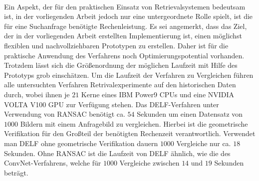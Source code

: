 \\
Ein Aspekt, der für den praktischen Einsatz von Retrievalsystemen bedeutsam ist, in der vorliegenden Arbeit jedoch nur eine untergeordnete Rolle spielt, ist die für eine Suchanfrage benötigte Rechenleistung. Es sei angemerkt, dass das Ziel, der in der vorliegenden Arbeit erstellten Implementierung ist, einen möglichst flexiblen und nachvollziehbaren Prototypen zu erstellen. Daher ist für die praktische Anwendung des Verfahrens noch Optimierungspotential vorhanden. Trotzdem lässt sich die Größenordnung der möglichen Laufzeit mit Hilfe des Prototyps grob einschätzen. Um die Laufzeit der Verfahren zu Vergleichen führen alle untersuchten Verfahren Retrivalexperimente auf den historischen Daten durch, wobei ihnen je $21$ Kerne eines IBM Power9 CPUs und eine NVIDIA VOLTA V100 GPU zur Verfügung stehen. Das DELF-Verfahren unter Verwendung von RANSAC benötigt ca. $54$ Sekunden um einen Datensatz von $1000$ Bildern mit einem Anfragebild zu vergleichen. Hierbei ist die geometrische Verifikation für den Großteil der benötigten Rechenzeit verantwortlich. Verwendet man DELF ohne geometrische Verifikation dauern $1000$ Vergleiche nur ca. $18$ Sekunden. Ohne RANSAC ist die Laufzeit von DELF ähnlich, wie die des ConvNet-Verfahrens, welche für $1000$ Vergleiche zwischen $14$ und $19$ Sekunden beträgt. 
\\
\begin{table}[h]
\caption{Erreichte mAP der unterschiedlichen Verfahren bzw. Konfigurationen auf den historischen Daten, basierend auf $42$ Anfragen. Dargestellt für die einzelnen Kategorien, sowie für alle Anfragen. Achtung, für die einzelnen Kategorien werden unterschiedlich viele Anfragebilder betrachtet (vgl. Tab. \ref{hist4d_data}, S. \ref{hist4d_data}).}
\label{comp_bench}
\end{table}
